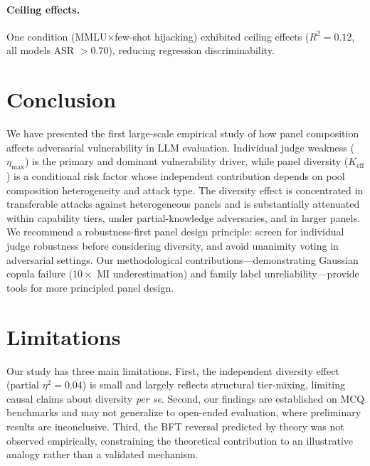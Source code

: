 \documentclass[11pt,a4paper]{article}
\newcommand{\keff}{K_{\text{eff}}}
\newcommand{\etamax}{\eta_{\max}}
\begin{document}
\paragraph{Ceiling effects.} One condition (MMLU$\times$few-shot hijacking) exhibited ceiling effects ($R^2 = 0.12$, all models ASR $> 0.70$), reducing regression discriminability.

\section{Conclusion}

We have presented the first large-scale empirical study of how panel composition affects adversarial vulnerability in LLM evaluation. Individual judge weakness ($\etamax$) is the primary and dominant vulnerability driver, while panel diversity ($\keff$) is a conditional risk factor whose independent contribution depends on pool composition heterogeneity and attack type. The diversity effect is concentrated in transferable attacks against heterogeneous panels and is substantially attenuated within capability tiers, under partial-knowledge adversaries, and in larger panels. We recommend a robustness-first panel design principle: screen for individual judge robustness before considering diversity, and avoid unanimity voting in adversarial settings. Our methodological contributions---demonstrating Gaussian copula failure ($10\times$ MI underestimation) and family label unreliability---provide tools for more principled panel design.

\section*{Limitations}

Our study has three main limitations. First, the independent diversity effect (partial $\eta^2 = 0.04$) is small and largely reflects structural tier-mixing, limiting causal claims about diversity \textit{per se}. Second, our findings are established on MCQ benchmarks and may not generalize to open-ended evaluation, where preliminary results are inconclusive. Third, the BFT reversal predicted by theory was not observed empirically, constraining the theoretical contribution to an illustrative analogy rather than a validated mechanism.


\end{document}
